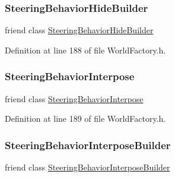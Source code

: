 \subsubsection{\texorpdfstring{Steering\+Behavior\+Hide\+Builder}{SteeringBehaviorHideBuilder}}
{\footnotesize\ttfamily friend class \mbox{\hyperlink{classnjli_1_1_steering_behavior_hide_builder}{Steering\+Behavior\+Hide\+Builder}}\hspace{0.3cm}{\ttfamily [friend]}}



Definition at line 188 of file World\+Factory.\+h.

\mbox{\label{classnjli_1_1_world_factory_a86b9d6c674361a8596e3b0fbb0f1f0d5}} 
\subsubsection{\texorpdfstring{Steering\+Behavior\+Interpose}{SteeringBehaviorInterpose}}
{\footnotesize\ttfamily friend class \mbox{\hyperlink{classnjli_1_1_steering_behavior_interpose}{Steering\+Behavior\+Interpose}}\hspace{0.3cm}{\ttfamily [friend]}}



Definition at line 189 of file World\+Factory.\+h.

\mbox{\label{classnjli_1_1_world_factory_a073d777b292e30fef8f545cc8a12defe}} 
\subsubsection{\texorpdfstring{Steering\+Behavior\+Interpose\+Builder}{SteeringBehaviorInterposeBuilder}}
{\footnotesize\ttfamily friend class \mbox{\hyperlink{classnjli_1_1_steering_behavior_interpose_builder}{Steering\+Behavior\+Interpose\+Builder}}\hspace{0.3cm}{\ttfamily [friend]}}



